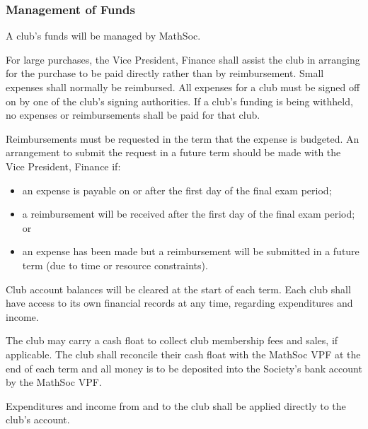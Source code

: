 \subsubsection{Management of Funds}
A club's funds will be managed by MathSoc.

For large purchases, the Vice President, Finance shall assist the club in
arranging for the purchase to be paid directly rather than by reimbursement.
Small expenses shall normally be reimbursed. All expenses for a club must be
signed off on by one of the club's signing authorities. If a club's funding is
being withheld, no expenses or reimbursements shall be paid for that club.

Reimbursements must be requested in the term that the expense is budgeted. 
An arrangement to submit the request in a future term should be made with
the Vice President, Finance if:
\begin{itemize}
	\item an expense is payable on or after the first day of the final exam period;
	\item a reimbursement will be received after the first day of the final exam period; or
	\item an expense has been made but a reimbursement will be submitted in a 
	future term (due to time or resource constraints).
\end{itemize}

Club account balances will be cleared at the start of each term. Each club shall have access to its own financial records at any time, regarding expenditures and income. 

The club may carry a cash float to collect club membership fees and sales, if applicable. 
The club shall reconcile their cash float with the MathSoc VPF at the end of each term and all money is to be deposited into the Society's bank account by the MathSoc VPF. 

Expenditures and income from and to the club shall be applied directly to the club's account. 
